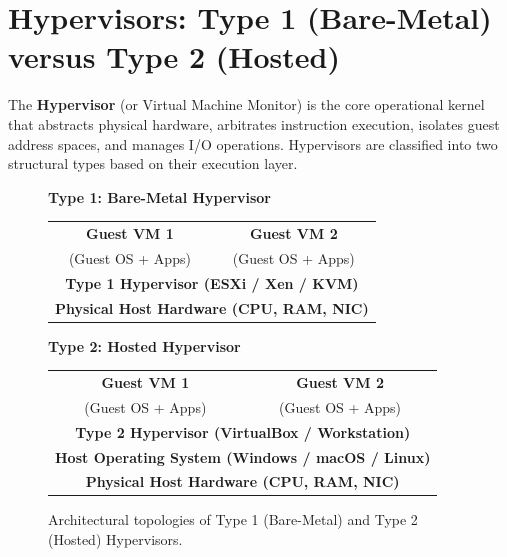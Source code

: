 \section{Hypervisors: Type 1 (Bare-Metal) versus Type 2 (Hosted)}
\label{sec:hypervisors}

The \textbf{Hypervisor} (or Virtual Machine Monitor) is the core operational kernel that abstracts physical hardware, arbitrates instruction execution, isolates guest address spaces, and manages I/O operations. Hypervisors are classified into two structural types based on their execution layer.

\begin{figure}[htbp]
\centering
\small
\begin{tcolorbox}[colback=blue!5!white,colframe=blue!75!black,title=\textbf{Structural Comparison of Hypervisor Architectures}]
\begin{minipage}{0.48\textwidth}
\centering
\textbf{Type 1: Bare-Metal Hypervisor}
\vspace{0.3cm}

\begin{tabular}{|c|c|}
\hline
\textbf{Guest VM 1} & \textbf{Guest VM 2} \\
(Guest OS + Apps) & (Guest OS + Apps) \\
\hline
\multicolumn{2}{|c|}{\textbf{Type 1 Hypervisor (ESXi / Xen / KVM)}} \\
\hline
\multicolumn{2}{|c|}{\textbf{Physical Host Hardware (CPU, RAM, NIC)}} \\
\hline
\end{tabular}
\end{minipage}
\hfill
\begin{minipage}{0.48\textwidth}
\centering
\textbf{Type 2: Hosted Hypervisor}
\vspace{0.3cm}

\begin{tabular}{|c|c|}
\hline
\textbf{Guest VM 1} & \textbf{Guest VM 2} \\
(Guest OS + Apps) & (Guest OS + Apps) \\
\hline
\multicolumn{2}{|c|}{\textbf{Type 2 Hypervisor (VirtualBox / Workstation)}} \\
\hline
\multicolumn{2}{|c|}{\textbf{Host Operating System (Windows / macOS / Linux)}} \\
\hline
\multicolumn{2}{|c|}{\textbf{Physical Host Hardware (CPU, RAM, NIC)}} \\
\hline
\end{tabular}
\end{minipage}
\end{tcolorbox}
\caption{Architectural topologies of Type 1 (Bare-Metal) and Type 2 (Hosted) Hypervisors.}
\label{fig:hypervisor_topologies}
\end{figure}


